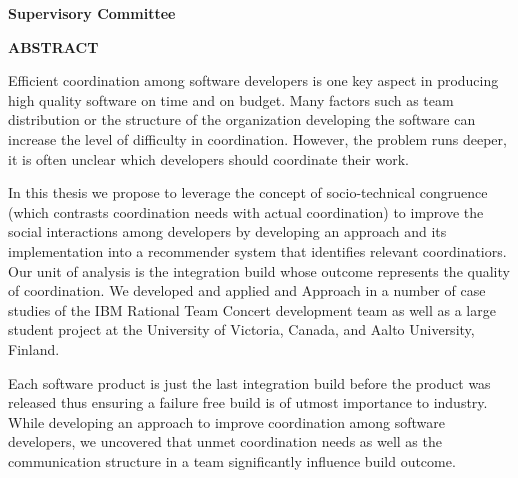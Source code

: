 \newpage
{}

\noindent \textbf{Supervisory Committee}
\tpbreak
\panel

\begin{center}
\textbf{ABSTRACT}
\end{center}
Efficient coordination among software developers is one key aspect in producing high quality software on time and on budget.
Many factors such as team distribution or the structure of the organization developing the software can increase the level of difficulty in coordination.
However, the problem runs deeper, it is often unclear which developers should coordinate their work.

In this thesis we propose to leverage the concept of socio-technical congruence (which contrasts coordination needs with actual coordination) to improve the social interactions among developers 
by developing an approach and its implementation into a recommender system that identifies relevant coordinatiors.
Our unit of analysis is the integration build whose outcome represents the quality of coordination.
We developed and applied and Approach in a number of case studies of the IBM Rational Team Concert development team as well as a large student project at the University of Victoria, Canada, and Aalto University, Finland.

Each software product is just the last integration build before the product was released thus ensuring a failure free build is of utmost importance to industry.
While developing an approach to improve coordination among software developers, we uncovered that unmet coordination needs as well as the communication structure in a team significantly influence build outcome.